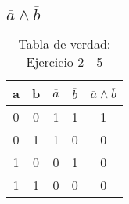 \subsection{$\overline{a}\wedge \overline{b}$}
\begin{table}[!ht]
    \centering
    \begin{tabular}{|c|c|c|c|c|}
        \hline
        a & b & \rule{0pt}{2.5ex}$\overline{a}$ & \rule{0pt}{2.5ex}$\overline{b}$ & $\overline{a}\wedge \overline{b}$\\
        \hline
        0 & 0 & 1 & 1 & 1\\
        \hline
        0 & 1 & 1 & 0 & 0\\
        \hline
        1 & 0 & 0 & 1 & 0\\
        \hline
        1 & 1 & 0 & 0 & 0\\
        \hline
    \end{tabular}
    \caption{Tabla de verdad: Ejercicio 2 - 5}\label{table:2-5}
\end{table}